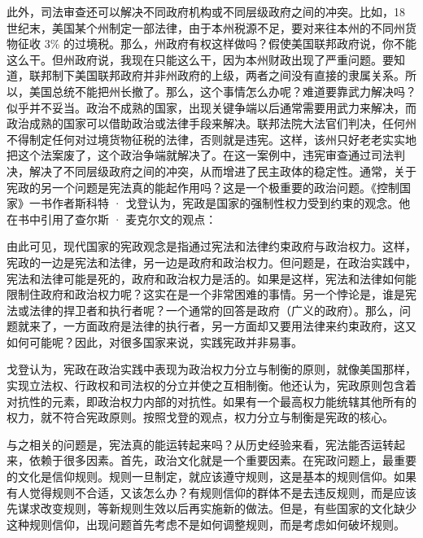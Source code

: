 此外，司法审查还可以解决不同政府机构或不同层级政府之间的冲突。比如，18 世纪末，美国某个州制定一部法律，由于本州税源不足，要对来往本州的不同州货物征收 3\% 的过境税。那么，州政府有权这样做吗？假使美国联邦政府说，你不能这么干。但州政府说，我现在只能这么干，因为本州财政出现了严重问题。要知道，联邦制下美国联邦政府并非州政府的上级，两者之间没有直接的隶属关系。所以，美国总统不能把州长撤了。那么，这个事情怎么办呢？难道要靠武力解决吗？似乎并不妥当。政治不成熟的国家，出现关键争端以后通常需要用武力来解决，而政治成熟的国家可以借助政治或法律手段来解决。联邦法院大法官们判决，任何州不得制定任何对过境货物征税的法律，否则就是违宪。这样，该州只好老老实实地把这个法案废了，这个政治争端就解决了。在这一案例中，违宪审查通过司法判决，解决了不同层级政府之间的冲突，从而增进了民主政体的稳定性。通常，关于宪政的另一个问题是宪法真的能起作用吗？这是一个极重要的政治问题。《控制国家》一书作者斯科特 · 戈登认为，宪政是国家的强制性权力受到约束的观念。他在书中引用了查尔斯 · 麦克尔文的观点：


由此可见，现代国家的宪政观念是指通过宪法和法律约束政府与政治权力。这样，宪政的一边是宪法和法律，另一边是政府和政治权力。但问题是，在政治实践中，宪法和法律可能是死的，政府和政治权力是活的。如果是这样，宪法和法律如何能限制住政府和政治权力呢？这实在是一个非常困难的事情。另一个悖论是，谁是宪法或法律的捍卫者和执行者呢？一个通常的回答是政府（广义的政府）。那么，问题就来了，一方面政府是法律的执行者，另一方面却又要用法律来约束政府，这又如何可能呢？因此，对很多国家来说，实践宪政并非易事。

戈登认为，宪政在政治实践中表现为政治权力分立与制衡的原则，就像美国那样，实现立法权、行政权和司法权的分立并使之互相制衡。他还认为，宪政原则包含着对抗性的元素，即政治权力内部的对抗性。如果有一个最高权力能统辖其他所有的权力，就不符合宪政原则。按照戈登的观点，权力分立与制衡是宪政的核心。

与之相关的问题是，宪法真的能运转起来吗？从历史经验来看，宪法能否运转起来，依赖于很多因素。首先，政治文化就是一个重要因素。在宪政问题上，最重要的文化是信仰规则。规则一旦制定，就应该遵守规则，这是基本的规则信仰。如果有人觉得规则不合适，又该怎么办？有规则信仰的群体不是去违反规则，而是应该先谋求改变规则，等新规则生效以后再实施新的做法。但是，有些国家的文化缺少这种规则信仰，出现问题首先考虑不是如何调整规则，而是考虑如何破坏规则。

